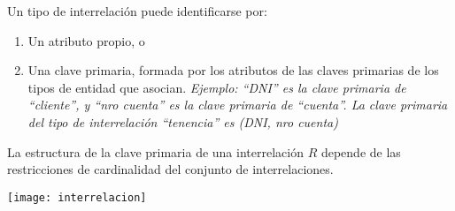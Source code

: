 \documentclass[a4paper, twoside]{article}
\begin{document}
Un tipo de interrelación puede identificarse por:
\begin{enumerate}
\item Un atributo propio, o
\item Una clave primaria, formada por los atributos de las claves primarias
de los tipos de entidad que asocian. \emph{Ejemplo: ``DNI'' es la
clave primaria de ``cliente'', y ``nro cuenta'' es la clave primaria
de ``cuenta''. La clave primaria del tipo de interrelación ``tenencia''
es (DNI, nro cuenta)}
\end{enumerate}
La estructura de la clave primaria de una interrelación $R$ depende
de las restricciones de cardinalidad del conjunto de interrelaciones.

\noindent \begin{center}
\texttt{[image: interrelacion]}
\par\end{center}
\end{document}
